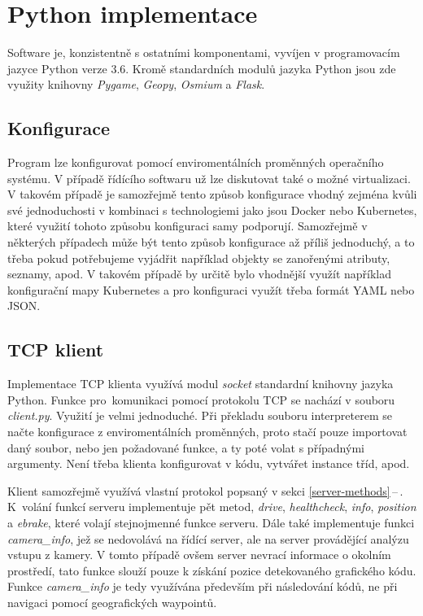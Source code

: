 \documentclass[czech, bachelor]{diploma}
\newcommand{\peteref}[1]{\ref{#1}\,--\,\nameref{#1}}
\begin{document}
\section{Python implementace}

Software je, konzistentně s ostatními komponentami, vyvíjen v programovacím jazyce Python verze 3.6. Kromě standardních modulů
jazyka Python jsou zde využity knihovny \emph{Pygame}, \emph{Geopy}, \emph{Osmium} a \emph{Flask}.

\subsection{Konfigurace}

Program lze konfigurovat pomocí enviromentálních proměnných operačního systému. V případě řídícího softwaru už lze diskutovat také
o možné virtualizaci. V takovém případě je samozřejmě tento způsob konfigurace vhodný zejména kvůli své jednoduchosti v kombinaci
s technologiemi jako jsou Docker nebo Kubernetes, které využití tohoto způsobu konfiguraci samy podporují. Samozřejmě v některých
případech může být tento způsob konfigurace až příliš jednoduchý, a to třeba pokud potřebujeme vyjádřit například objekty
se zanořenými atributy, seznamy, apod. V takovém případě by určitě bylo vhodnější využít například konfigurační mapy Kubernetes
a pro konfiguraci využít třeba formát YAML nebo JSON.

\subsection{TCP klient}

Implementace TCP klienta využívá modul \emph{socket} standardní knihovny jazyka Python. Funkce pro~komunikaci pomocí protokolu TCP
se nachází v souboru \emph{client.py}. Využití je velmi jednoduché. Při překladu souboru interpreterem se načte konfigurace
z enviromentálních proměnných, proto stačí pouze importovat daný soubor, nebo jen požadované funkce, a ty poté volat s případnými
argumenty. Není třeba klienta konfigurovat v kódu, vytvářet instance tříd, apod.

Klient samozřejmě využívá vlastní protokol popsaný v sekci \peteref{server-methods}. K~volání funkcí serveru implementuje pět
metod, \emph{drive}, \emph{healthcheck}, \emph{info}, \emph{position} a \emph{ebrake}, které volají stejnojmenné funkce serveru.
Dále také implementuje funkci \emph{camera\_info}, jež se nedovolává na řídící server, ale na server provádějící analýzu vstupu
z kamery. V tomto případě ovšem server nevrací informace o okolním prostředí, tato funkce slouží pouze k získání pozice
detekovaného grafického kódu. Funkce \emph{camera\_info} je tedy využívána především při následování kódů, ne při navigaci pomocí
geografických waypointů.
\end{document}

